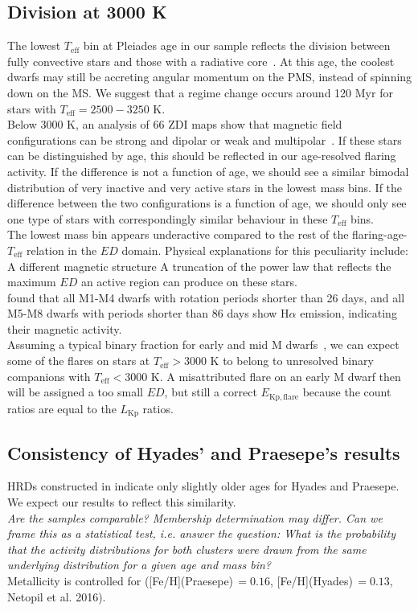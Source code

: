 \documentclass{aa}
\begin{document}
\subsection{Division at 3000 K}
The lowest $T_\mathrm{eff}$ bin at Pleiades age in our sample reflects the division between fully convective stars and those with a radiative core~\citep{reid_new_2005}. At this age, the coolest dwarfs may still be accreting angular momentum on the PMS, instead of spinning down on the MS. We suggest that a regime change occurs around 120 Myr for stars with $T_\mathrm{eff}=2500-3250$ K.
\\
Below 3000 K, an analysis of 66 ZDI maps show that magnetic field configurations can be strong and dipolar or weak and multipolar~\citep{morin_m4magneticfields_2008, see_zdispindown_2017}. If these stars can be distinguished by age, this should be reflected in our age-resolved flaring activity. If the difference is not a function of age, we should see a similar bimodal distribution of very inactive and very active stars in the lowest mass bins. If the difference between the two configurations is a function of age, we should only see one type of stars with correspondingly similar behaviour in these $T_\mathrm{eff}$ bins.
\\
The lowest mass bin appears underactive compared to the rest of the flaring-age-$T_\mathrm{eff}$ relation in the $ED$ domain. Physical explanations for this peculiarity include:
A different magnetic structure
A truncation of the power law that reflects the maximum $ED$ an active region can produce on these stars.
\\
\citet{west_magneticrotationage_2015} found that all M1-M4 dwarfs with rotation periods shorter than 26 days, and all M5-M8 dwarfs with periods shorter than 86 days show H$\alpha$ emission, indicating their magnetic activity.
\\
Assuming a typical binary fraction for early and mid M dwarfs~\citep{fischer_multiplicity_1992}, we can expect some of the flares on stars at $T_\mathrm{eff}>3000$ K to belong to unresolved binary companions with $T_\mathrm{eff}<3000$ K. A misattributed flare on an early M dwarf then will be assigned a too small $ED$, but still a correct $E_\mathrm{Kp, flare}$ because the count ratios are equal to the $L_\mathrm{Kp}$ ratios.
\subsection{Consistency of Hyades' and Praesepe's results}
HRDs constructed in \citet{gaia_dr2_2018_hrd} indicate only slightly older ages for Hyades and Praesepe. We expect our results to reflect this similarity.
\\
\textit{Are the samples comparable? Membership determination may differ.
Can we frame this as a statistical test, i.e. answer the question: What is the probability that the activity distributions for both clusters were drawn from the same underlying distribution for a given age and mass bin?}
\\
Metallicity is controlled for ([Fe/H](Praesepe)\,$=0.16$, [Fe/H](Hyades)\,$=0.13$, Netopil et al. 2016).
\end{document}
